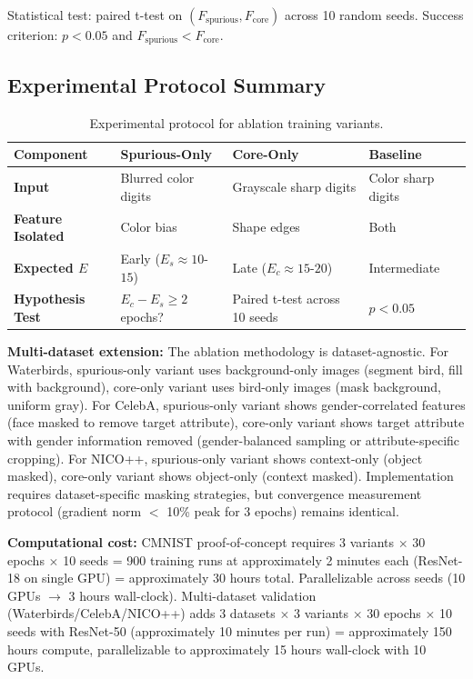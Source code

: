 Statistical test: paired t-test on $(F_{\text{spurious}}, F_{\text{core}})$ across 10 random seeds. Success criterion: $p < 0.05$ and $F_{\text{spurious}} < F_{\text{core}}$.

\subsection{Experimental Protocol Summary}

\begin{table}[h]
\centering
\small
\begin{tabular}{@{}llll@{}}
\toprule
\textbf{Component} & \textbf{Spurious-Only} & \textbf{Core-Only} & \textbf{Baseline} \\
\midrule
\textbf{Input} & Blurred color digits & Grayscale sharp digits & Color sharp digits \\
\textbf{Feature Isolated} & Color bias & Shape edges & Both \\
\textbf{Expected $E$} & Early ($E_s \approx 10$-$15$) & Late ($E_c \approx 15$-$20$) & Intermediate \\
\textbf{Hypothesis Test} & $E_c - E_s \geq 2$ epochs? & Paired t-test across 10 seeds & $p < 0.05$ \\
\bottomrule
\end{tabular}
\caption{Experimental protocol for ablation training variants.}
\label{tab:protocol}
\end{table}

\textbf{Multi-dataset extension:} The ablation methodology is dataset-agnostic. For Waterbirds, spurious-only variant uses background-only images (segment bird, fill with background), core-only variant uses bird-only images (mask background, uniform gray). For CelebA, spurious-only variant shows gender-correlated features (face masked to remove target attribute), core-only variant shows target attribute with gender information removed (gender-balanced sampling or attribute-specific cropping). For NICO++, spurious-only variant shows context-only (object masked), core-only variant shows object-only (context masked). Implementation requires dataset-specific masking strategies, but convergence measurement protocol (gradient norm $<$ 10\% peak for 3 epochs) remains identical.

\textbf{Computational cost:} CMNIST proof-of-concept requires 3 variants $\times$ 30 epochs $\times$ 10 seeds = 900 training runs at approximately 2 minutes each (ResNet-18 on single GPU) = approximately 30 hours total. Parallelizable across seeds (10 GPUs $\rightarrow$ 3 hours wall-clock). Multi-dataset validation (Waterbirds/CelebA/NICO++) adds 3 datasets $\times$ 3 variants $\times$ 30 epochs $\times$ 10 seeds with ResNet-50 (approximately 10 minutes per run) = approximately 150 hours compute, parallelizable to approximately 15 hours wall-clock with 10 GPUs.

